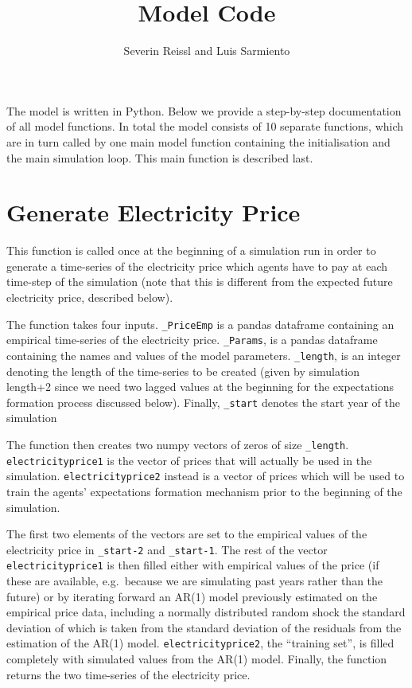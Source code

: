 \documentclass[
  letterpaper,
  DIV=11,
  numbers=noendperiod]{scrartcl}
\title{Model Code}
\author{Severin Reissl and Luis Sarmiento}
\date{}
\renewcommand*\contentsname{Table of contents}
\newcommand\contentsname{Table of contents}
\begin{document}
\maketitle
\ifdefined\Shaded\renewenvironment{Shaded}{\begin{tcolorbox}[frame hidden, interior hidden, enhanced, boxrule=0pt, borderline west={3pt}{0pt}{shadecolor}, sharp corners, breakable]}{\end{tcolorbox}}\fi

\renewcommand*\contentsname{Table of contents}
{
\hypersetup{linkcolor=}
\setcounter{tocdepth}{3}
\tableofcontents
}
The model is written in Python. Below we provide a step-by-step
documentation of all model functions. In total the model consists of 10
separate functions, which are in turn called by one main model function
containing the initialisation and the main simulation loop. This main
function is described last.

\hypertarget{generate-electricity-price}{%
\section{Generate Electricity Price}\label{generate-electricity-price}}

This function is called once at the beginning of a simulation run in
order to generate a time-series of the electricity price which agents
have to pay at each time-step of the simulation (note that this is
different from the expected future electricity price, described below).

The function takes four inputs. \texttt{\_PriceEmp} is a pandas
dataframe containing an empirical time-series of the electricity price.
\texttt{\_Params}, is a pandas dataframe containing the names and values
of the model parameters. \texttt{\_length}, is an integer denoting the
length of the time-series to be created (given by simulation length+2
since we need two lagged values at the beginning for the expectations
formation process discussed below). Finally, \texttt{\_start} denotes
the start year of the simulation

The function then creates two numpy vectors of zeros of size
\texttt{\_length}. \texttt{electricityprice1} is the vector of prices
that will actually be used in the simulation. \texttt{electricityprice2}
instead is a vector of prices which will be used to train the agents'
expectations formation mechanism prior to the beginning of the
simulation.

The first two elements of the vectors are set to the empirical values of
the electricity price in \texttt{\_start-2} and \texttt{\_start-1}. The
rest of the vector \texttt{electricityprice1} is then filled either with
empirical values of the price (if these are available, e.g.~because we
are simulating past years rather than the future) or by iterating
forward an AR(1) model previously estimated on the empirical price data,
including a normally distributed random shock the standard deviation of
which is taken from the standard deviation of the residuals from the
estimation of the AR(1) model. \texttt{electricityprice2}, the
``training set'', is filled completely with simulated values from the
AR(1) model. Finally, the function returns the two time-series of the
electricity price.
\end{document}

